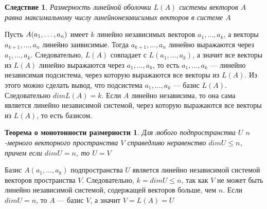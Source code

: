 \newtheorem*{cor5_3}{Следствие}\begin{cor5_3}Размерность линейной оболочки $L
	(A)$ системы векторов $A$ равна максимальному числу линейнонезависимых векторов в системе $A$\end{cor5_3}
\begin{Proof}
	Пусть $A(a_1,\dots,a_n)$ имеет $k$ линейно независимых векторов $a_1,\dots,a_k$, а векторы $a_{k+1},\dots,a_n$ линейно заивисимые. Тогда $a_{k+1},\dots,a_n$ линейно выражаются через $a_1,\dots,a_k$. Следовательно, $L(A)$ совпадает с $L(a_1,\dots,a_k)$, а значит все векторы из $L(A)$ линейно выражаются через $a_1,\dots,a_k$, то есть $a_1,\dots,a_k$ --- линейно независимая подсистема, через которую выражаются все векторы из $L(A)$. Из этого можно сделать вывод, что подсистема $a_1,\dots,a_k$ --- базис $L(A)$. Следовательно $dimL(A) = k$. Если $A$ линейно независима, то она сама является линейно независимой системой, через которую выражаются все векторы из $L(A)$, то есть базисом.
\end{Proof}
\newtheorem*{th5_2}{Теорема о монотонности размерности}\begin{th5_2}Для любого подпространства $U$ $n$-мерного векторного пространства $V$ справедливо неравенство $dimU\leqslant n$, причем если $dimU = n$, то $U=V$ \end{th5_2}
\begin{Proof}
	Базис $A(a_1,\dots,a_k)$ подпространства $U$ является линейно независимой системой векторов пространства $V$. Следовательно, $k = dim U \leqslant n$, так как $V$ не может быть линейно независимой системой, содержащей векторов больше, чем $n$. Если $dim U = n$, то $A$ --- базис $V$, а значит $V = L(A) = U$
\end{Proof}












